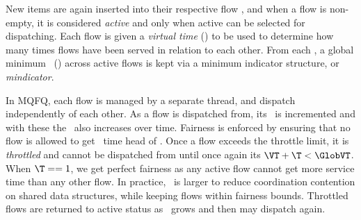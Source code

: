 New items are again inserted into their respective flow , and when a flow is non-empty, it is considered \emph{active} and only when active can be selected for dispatching.
Each flow is given a \emph{virtual time} (\VT) to be used to determine how many times flows have been served in relation to each other.
From each \VT, a global minimum \VT~(\GlobVT) across active flows is kept via a minimum indicator structure, or \emph{mindicator}.

In MQFQ, each flow is managed by a separate thread, and dispatch independently of each other.
As a flow is dispatched from, its \VT~is incremented and with these the \GlobVT~also increases over time.
Fairness is enforced by ensuring that no flow is allowed to get \T~time head of \GlobVT.
Once a flow exceeds the throttle limit, it is \emph{throttled} and cannot be dispatched from until once again its $\VT + \T < \GlobVT$.
When $\T == 1$, we get perfect fairness as any active flow cannot get more service time than any other flow.
In practice, \T~is larger to reduce coordination contention on shared data structures, while keeping flows within fairness bounds.
Throttled flows are returned to active status as \GlobVT~grows and then may dispatch again.

